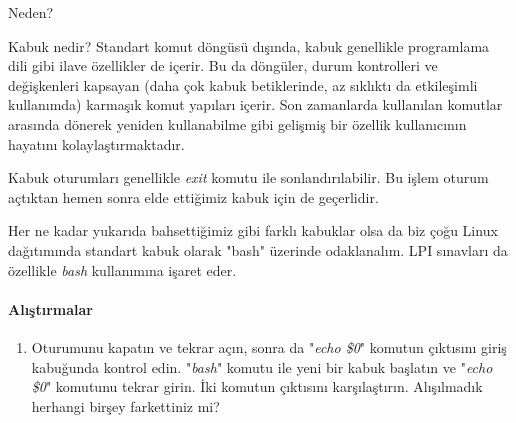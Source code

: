 \begin{section}{Neden?}
\begin{subsection}{Kabuk nedir?}
Standart komut döngüsü dışında, kabuk genellikle programlama dili gibi ilave özellikler de içerir. Bu da döngüler, durum kontrolleri ve değişkenleri kapsayan (daha çok kabuk betiklerinde, az sıklıktı da etkileşimli kullanımda) karmaşık komut yapıları içerir. Son zamanlarda kullanılan komutlar arasında dönerek yeniden kullanabilme gibi gelişmiş bir özellik kullanıcının hayatını kolaylaştırmaktadır.

Kabuk oturumları genellikle \emph{exit} komutu ile sonlandırılabilir. Bu işlem oturum açtıktan hemen sonra elde ettiğimiz kabuk için de geçerlidir.

Her ne kadar yukarıda bahsettiğimiz gibi farklı kabuklar olsa da biz çoğu Linux dağıtımında standart kabuk olarak "bash" üzerinde odaklanalım. LPI sınavları da özellikle \emph{bash} kullanımına işaret eder.
\paragraph{Alıştırmalar}{
\pointedenum\begin{enumerate}
 \item Oturumunu kapatın ve tekrar açın, sonra da "\emph{echo \$0}" komutun çıktısını giriş kabuğunda kontrol edin. "\emph{bash}" komutu ile yeni bir kabuk başlatın ve "\emph{echo \$0}" komutunu tekrar girin. İki komutun çıktısını karşılaştırın. Alışılmadık herhangi birşey farkettiniz mi?
\end{enumerate}}
\end{subsection}
\end{section}
